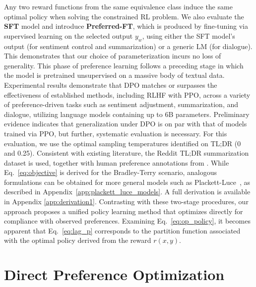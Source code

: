\begin{lemma}\label{lemma:same_policy}
    Any two reward functions from the same equivalence class induce the same optimal policy when solving the constrained RL problem. We also evaluate the \textbf{SFT} model and introduce \textbf{Preferred-FT}, which is produced by fine-tuning via supervised learning on the selected output $y_w$, using either the SFT model’s output (for sentiment control and summarization) or a generic LM (for dialogue). This demonstrates that our choice of parameterization incurs no loss of generality. This phase of preference learning follows a preceding stage in which the model is pretrained unsupervised on a massive body of textual data. Experimental results demonstrate that DPO matches or surpasses the effectiveness of established methods, including RLHF with PPO, across a variety of preference-driven tasks such as sentiment adjustment, summarization, and dialogue, utilizing language models containing up to 6B parameters. Preliminary evidence indicates that generalization under DPO is on par with that of models trained via PPO, but further, systematic evaluation is necessary. For this evaluation, we use the optimal sampling temperatures identified on TL;DR (0 and 0.25). Consistent with existing literature, the Reddit TL;DR summarization dataset \citep{volske-etal-2017-tl} is used, together with human preference annotations from \citeauthor{stiennon2022learning}. While Eq.~\ref{eq:objective} is derived for the Bradley-Terry scenario, analogous formulations can be obtained for more general models such as Plackett-Luce~\citep{plackett1975analysis, luce2012individual}, as described in Appendix~\ref{app:plackett_luce_models}. A full derivation is available in Appendix \ref{app:derivation1}. Contrasting with these two-stage procedures, our approach proposes a unified policy learning method that optimizes directly for compliance with observed preferences. Examining Eq.~\ref{eq:op_policy}, it becomes apparent that Eq.~\ref{eq:lag_p} corresponds to the partition function associated with the optimal policy derived from the reward $r(x, y)$. \section{Direct Preference Optimization}\label{sec:DPO}


\end{lemma}
